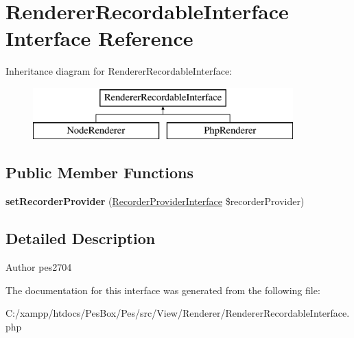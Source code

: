 \hypertarget{interface_pes_1_1_view_1_1_renderer_1_1_renderer_recordable_interface}{}\section{Renderer\+Recordable\+Interface Interface Reference}
\label{interface_pes_1_1_view_1_1_renderer_1_1_renderer_recordable_interface}
Inheritance diagram for Renderer\+Recordable\+Interface\+:\begin{figure}[H]
\begin{center}
\leavevmode
\includegraphics[height=2.000000cm]{interface_pes_1_1_view_1_1_renderer_1_1_renderer_recordable_interface}
\end{center}
\end{figure}
\subsection*{Public Member Functions}
\begin{DoxyCompactItemize}
\item 
\mbox{\label{interface_pes_1_1_view_1_1_renderer_1_1_renderer_recordable_interface_a8fd12d6021bfe986b2f45230378d6bc2}} 
{\bfseries set\+Recorder\+Provider} (\mbox{\hyperlink{interface_pes_1_1_view_1_1_recorder_1_1_recorder_provider_interface}{Recorder\+Provider\+Interface}} \$recorder\+Provider)
\end{DoxyCompactItemize}


\subsection{Detailed Description}
\begin{DoxyAuthor}{Author}
pes2704 
\end{DoxyAuthor}


The documentation for this interface was generated from the following file\+:\begin{DoxyCompactItemize}
\item 
C\+:/xampp/htdocs/\+Pes\+Box/\+Pes/src/\+View/\+Renderer/Renderer\+Recordable\+Interface.\+php\end{DoxyCompactItemize}
